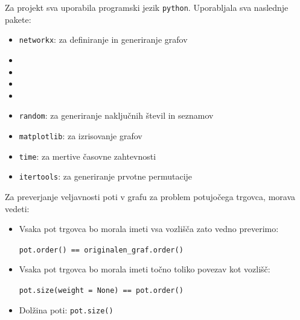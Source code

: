 \documentclass[12pt, a4paper]{article}
\begin{document}
Za projekt sva uporabila programski jezik \texttt{python}. Uporabljala sva naslednje pakete:

\begin{itemize}

\item \texttt{networkx}: za definiranje in generiranje grafov

\item \texttt{}

\item \texttt{}

\item \texttt{}

\item \texttt{}

\item \texttt{random}: za generiranje naključnih števil in seznamov

\item \texttt{matplotlib}: za izrisovanje grafov

\item \texttt{time}: za mertive časovne zahtevnosti

\item \texttt{itertools}: za generiranje prvotne permutacije

\end{itemize}

Za preverjanje veljavnosti poti v grafu za problem potujočega trgovca, morava vedeti:

\begin{itemize}

\item Vsaka pot trgovca bo morala imeti vsa vozlišča zato vedno preverimo:
\begin{center}
\texttt{pot.order() == originalen\_graf.order()}
\end{center}
\item Vsaka pot trgovca bo morala imeti točno toliko povezav kot vozlišč:
\begin{center}
\texttt{pot.size(weight = None) == pot.order()} 
\end{center}
\item Dolžina poti: \texttt{pot.size()}

\end{itemize}
\end{document}
